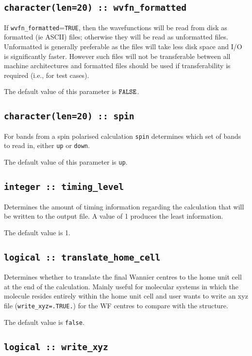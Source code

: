 \subsection[wvfn\_formated]{\tt character(len=20) :: wvfn\_formatted}

If \verb#wvfn_formatted#=\verb#TRUE#, then the wavefunctions will be
read from disk as formatted (ie ASCII) files; otherwise they will be
read as unformatted files. Unformatted is generally preferable as the
files will take less disk space and I/O is significantly
faster. However such files will not be transferable between all
machine architectures and formatted files should be used if
transferability is required (i.e., for test cases).

The default value of this parameter is $\verb#FALSE#$.


\subsection[spin]{\tt character(len=20) :: spin}
For bands from a spin polarised calculation {\tt spin} determines which set
of bands to read in, either \verb#up# or \verb#down#.

The default value of this parameter is \verb#up#.


\subsection[timing\_level]{\tt integer :: timing\_level}

Determines the amount of timing information regarding the calculation
that will be written to the output file. A value of 1 produces the
least information. 

The default value is 1.

\subsection[translate\_home\_cell]{\tt logical :: translate\_home\_cell}

Determines whether to translate the final Wannier centres to the home
unit cell at the end of the calculation. Mainly useful for molecular
systems in which the molecule resides entirely within the home unit 
cell and user wants to write an xyz file ({\tt write\_xyz=.TRUE.}) for
the WF centres to compare with the structure. 

The default value is \verb#false#. 

\subsection[write\_xyz]{\tt logical :: write\_xyz}


